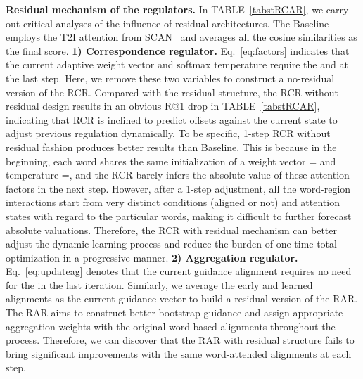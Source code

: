 \documentclass[journal]{IEEEtran}\newcommand{\ignore}[1]{}
\begin{document}
\textbf{Residual mechanism of the regulators.} 
In TABLE~\ref{tabstRCAR}, we carry out critical analyses of the influence of residual architectures. The Baseline employs the T2I attention from SCAN~\cite{SCAN} and averages all the cosine similarities as the final score. 
\textbf{1) Correspondence regulator.} Eq.~\eqref{eq:factors} indicates that the current adaptive weight vector  and softmax temperature  require the  and  at the last step. Here, we remove these two variables to construct a no-residual version of the RCR.
Compared with the residual structure, the RCR without residual design results in an obvious R@1 drop in TABLE~\ref{tabstRCAR}, indicating that RCR is inclined to predict offsets against the current state to adjust previous regulation dynamically. To be specific, 1-step RCR without residual fashion produces better results than Baseline. This is because in the beginning, each word shares the same initialization of a weight vector = and temperature =, and the RCR barely infers the absolute value of these attention factors in the next step. However, after a 1-step adjustment, all the word-region interactions start from very distinct conditions (aligned or not) and attention states with regard to the particular words, making it difficult to further forecast absolute valuations. Therefore, the RCR with residual mechanism can better adjust the dynamic learning process and reduce the burden of one-time total optimization in a progressive manner. 
\textbf{2) Aggregation regulator.} Eq.~\eqref{eq:updateag} denotes that the current guidance alignment  requires no need for the  in the last iteration. Similarly, we average the early and learned alignments as the current guidance vector to build a residual version of the RAR.
The RAR aims to construct better bootstrap guidance and assign appropriate aggregation weights with the original word-based alignments throughout the process. Therefore, we can discover that the RAR with residual structure fails to bring significant improvements with the same word-attended alignments at each step. 
\end{document}
